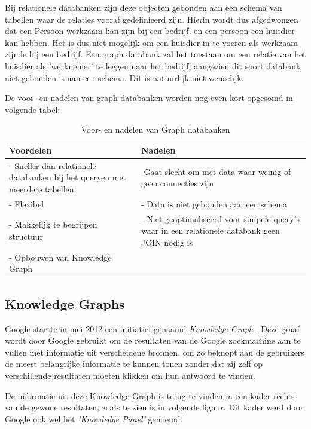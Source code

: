 Bij relationele databanken zijn deze objecten gebonden aan een schema van tabellen waar de relaties vooraf gedefinieerd zijn. Hierin wordt dus afgedwongen dat een Persoon werkzaam kan zijn bij een bedrijf, en een persoon een huisdier kan hebben. Het is dus niet mogelijk om een huisdier in te voeren als werkzaam zijnde bij een bedrijf.
Een graph databank zal het toestaan om een relatie van het huisdier als 'werknemer' te leggen naar het bedrijf, aangezien dit soort databank niet gebonden is aan een schema. Dit is natuurlijk niet wenselijk.

De voor- en nadelen van graph databanken worden nog even kort opgesomd in volgende tabel:

\begin{table}
	\begin{tabularx}{\textwidth}{|X|X|}
		\hline
		\textbf{Voordelen} & \textbf{Nadelen}  \\ 
		\hline
		 - Sneller dan relationele databanken bij het queryen met meerdere tabellen & -Gaat slecht om met data waar weinig of geen connecties zijn \\ 
		- Flexibel & - Data is niet gebonden aan een schema \\
		- Makkelijk te begrijpen structuur & - Niet geoptimaliseerd voor simpele query's waar in een relationele databank geen JOIN nodig is \\ 
		- Opbouwen van Knowledge Graph & \\
		\hline
	\end{tabularx}
 \caption[Voor- en nadelen van Graph databanken]{Voor- en nadelen van Graph databanken}
\end{table}

\subsection{Knowledge Graphs}
\label{sec:Knowledge Graphs}

Google startte in mei 2012 een initiatief genaamd \textit{Knowledge Graph} \autocite{GoogleKnowledgeGraph}. Deze graaf wordt door Google gebruikt om de resultaten van de Google zoekmachine aan te vullen met informatie uit verscheidene bronnen, om zo beknopt aan de gebruikers de meest belangrijke informatie te kunnen tonen zonder dat zij zelf op verschillende resultaten moeten klikken om hun antwoord te vinden. 

De informatie uit deze Knowledge Graph is terug te vinden in een kader rechts van de gewone resultaten, zoals te zien is in volgende figuur. Dit kader werd door Google ook wel het \textit{'Knowledge Panel'} genoemd. 

